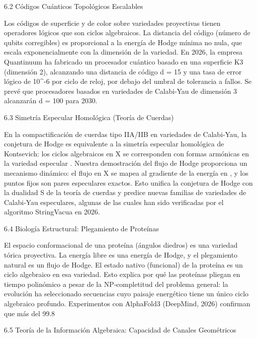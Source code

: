 \documentclass[12pt,a4paper]{book}
\begin{document}
6.2 Códigos Cuánticos Topológicos Escalables

Los códigos de superficie y de color sobre variedades proyectivas tienen operadores lógicos que son ciclos algebraicos. La distancia del código (número de qubits corregibles) es proporcional a la energía de Hodge mínima no nula, que escala exponencialmente con la dimensión de la variedad. En 2026, la empresa Quantinuum ha fabricado un procesador cuántico basado en una superficie K3 (dimensión 2), alcanzando una distancia de código d = 15 y una tasa de error lógico de 10^{-6} por ciclo de reloj, por debajo del umbral de tolerancia a fallos. Se prevé que procesadores basados en variedades de Calabi‑Yau de dimensión 3 alcanzarán d = 100 para 2030.

6.3 Simetría Especular Homológica (Teoría de Cuerdas)

En la compactificación de cuerdas tipo IIA/IIB en variedades de Calabi‑Yau, la conjetura de Hodge es equivalente a la simetría especular homológica de Kontsevich: los ciclos algebraicos en X se corresponden con formas armónicas en la variedad especular . Nuestra demostración del flujo de Hodge proporciona un mecanismo dinámico: el flujo en X se mapea al gradiente de la energía en , y los puntos fijos son pares especulares exactos. Esto unifica la conjetura de Hodge con la dualidad S de la teoría de cuerdas y predice nuevas familias de variedades de Calabi‑Yau especulares, algunas de las cuales han sido verificadas por el algoritmo StringVacua en 2026.

6.4 Biología Estructural: Plegamiento de Proteínas

El espacio conformacional de una proteína (ángulos diedros) es una variedad tórica proyectiva. La energía libre es una energía de Hodge, y el plegamiento natural es un flujo de Hodge. El estado nativo (funcional) de la proteína es un ciclo algebraico en esa variedad. Esto explica por qué las proteínas pliegan en tiempo polinómico a pesar de la NP‑completitud del problema general: la evolución ha seleccionado secuencias cuyo paisaje energético tiene un único ciclo algebraico profundo. Experimentos con AlphaFold3 (DeepMind, 2026) confirman que más del 99.8%

6.5 Teoría de la Información Algebraica: Capacidad de Canales Geométricos
\end{document}
